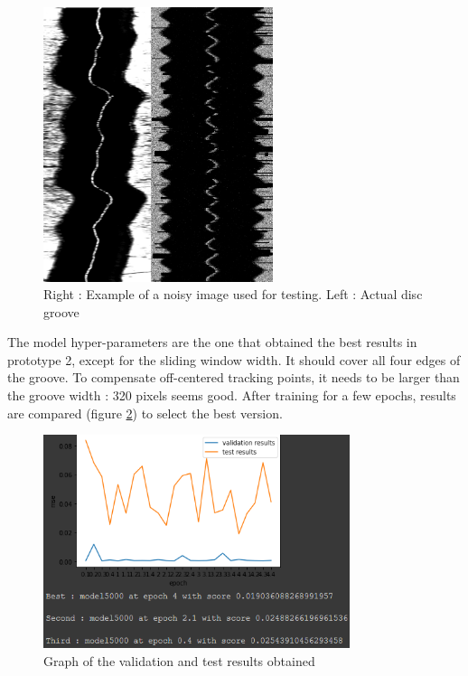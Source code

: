 \documentclass[12pt, twoside]{article}
\begin{document}
\begin{figure}
	\centering
	\includegraphics[width=0.6\textwidth]{../images/noisy_proto4.png}
	\caption{Right : Example of a noisy image used for testing. Left : Actual disc groove}
	\label{noisy_proto4}
\end{figure}

The model hyper-parameters are the one that obtained the best results in prototype 2, except for the sliding window width. It should cover all four edges of the groove. To compensate off-centered tracking points, it needs to be larger than the groove width : 320 pixels seems good. After training for a few epochs, results are compared (figure \ref{model_5000_res}) to select the best version.

\begin{figure}
	\centering
	\includegraphics[width=0.8\textwidth]{../images/model_5000_res.png}
	\caption{Graph of the validation and test results obtained }
	\label{model_5000_res}
\end{figure}
\end{document}
